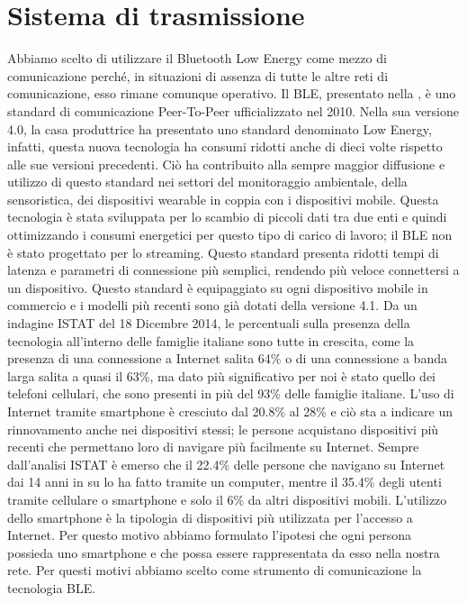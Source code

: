\section{Sistema di trasmissione}
Abbiamo scelto di utilizzare il Bluetooth Low Energy come mezzo di comunicazione perché, in situazioni di assenza di tutte le altre reti di comunicazione, esso rimane comunque operativo. Il BLE, presentato nella , è uno standard di comunicazione Peer-To-Peer ufficializzato nel 2010. Nella sua versione 4.0, la casa produttrice ha presentato uno standard denominato Low Energy, infatti, questa nuova tecnologia ha consumi ridotti anche di dieci volte rispetto alle sue versioni precedenti. Ciò ha contribuito alla sempre maggior diffusione e utilizzo di questo standard nei settori del monitoraggio ambientale, della sensoristica, dei dispositivi wearable in coppia con i dispositivi mobile. Questa tecnologia è stata sviluppata per lo scambio di piccoli dati tra due enti e quindi ottimizzando i consumi energetici per questo tipo di carico di lavoro; il BLE non è stato progettato per lo streaming. Questo standard presenta ridotti tempi di latenza e parametri di connessione più semplici, rendendo più veloce connettersi a un dispositivo. Questo standard è equipaggiato su ogni dispositivo mobile in commercio e i modelli più recenti sono già dotati della versione 4.1. Da un indagine ISTAT \cite{istat2014} del 18 Dicembre 2014, le percentuali sulla presenza della tecnologia all'interno delle famiglie italiane sono tutte in crescita, come la presenza di una connessione a Internet salita 64\% o di una connessione a banda larga salita a quasi il 63\%, ma dato più significativo per noi è stato quello dei telefoni cellulari, che sono presenti in più del 93\% delle famiglie italiane. L'uso di Internet tramite smartphone è cresciuto dal 20.8\% al 28\% e ciò sta a indicare un rinnovamento anche nei dispositivi stessi; le persone acquistano dispositivi più recenti che permettano loro di navigare più facilmente su Internet. Sempre dall'analisi ISTAT è emerso che il 22.4\% delle persone che navigano su Internet dai 14 anni in su lo ha fatto tramite un computer, mentre il 35.4\% degli utenti tramite cellulare o smartphone e solo il 6\% da altri dispositivi mobili. L'utilizzo dello smartphone è la tipologia di dispositivi più utilizzata per l'accesso a Internet. Per questo motivo abbiamo formulato l'ipotesi che ogni persona possieda uno smartphone e che possa essere rappresentata da esso nella nostra rete. Per questi motivi abbiamo scelto come strumento di comunicazione la tecnologia \acs{BLE}.

